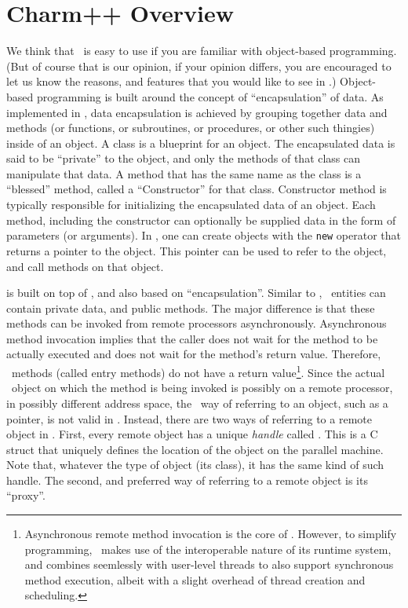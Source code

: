 \section{Charm++ Overview}

We think that \charmpp\ is easy to use if you are familiar with object-based
programming. (But of course that is our opinion, if your opinion differs, you
are encouraged to let us know the reasons, and features that you would like to
see in \charmpp.) Object-based programming is built around the concept of
``encapsulation'' of data. As implemented in \CC, data encapsulation is
achieved by grouping together data and methods (or functions, or subroutines,
or procedures, or other such thingies) inside of an object. A class is a
blueprint for an object.  The encapsulated data is said to be ``private'' to
the object, and only the methods of that class can manipulate that data. A
method that has the same name as the class is a ``blessed'' method, called a
``Constructor'' for that class.  Constructor method is typically responsible
for initializing the encapsulated data of an object. Each method, including the
constructor can optionally be
supplied data in the form of parameters (or arguments). In \CC, one can create objects with the {\tt new} operator that returns a pointer to the object. This pointer can be used to refer to the object, and call methods on that object.

\charmpp is built on top of \CC, and also based on ``encapsulation''. Similar
to \CC, \charmpp\ entities can contain private data, and public methods. The
major difference is that these methods can be invoked from remote processors
asynchronously.  Asynchronous method invocation implies that the caller does
not wait for the method to be actually executed and does not wait for the
method's return value. Therefore, \charmpp\ methods (called entry methods) do
not have a return value\footnote{Asynchronous remote method invocation is the
core of \charmpp. However, to simplify programming, \charmpp\ makes use of the
interoperable nature of its runtime system, and combines seemlessly with
user-level threads to also support synchronous method execution, albeit with a
slight overhead of thread creation and scheduling.}. Since the actual \charmpp\
object on which the method is being invoked is possibly on a remote processor,
in possibly different address space, the \CC\ way of referring to an object,
such as a pointer, is not valid in \charmpp.  Instead, there are two ways of
referring to a remote object in \charmpp. First, every remote object has a
unique {\em handle} called \kw{ChareID}. This is a C struct that uniquely
defines the location of the object on the parallel machine. Note that, whatever
the type of object (its class), it has the same kind of such handle. The
second, and preferred way of referring to a remote object is its ``proxy''.

